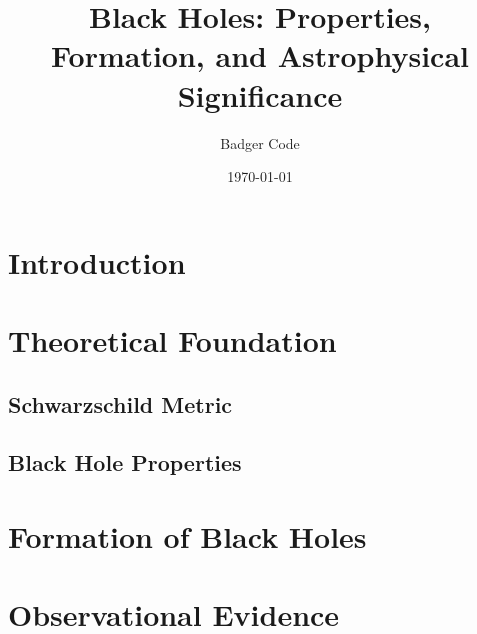 \documentclass{article}
\title{Black Holes: Properties, Formation, and Astrophysical Significance}
\author{Badger Code}
\date{\today}
\begin{document}
\maketitle

\section{Introduction}
\label{sec:introduction}

\section{Theoretical Foundation}
\label{sec:theoretical_foundation}

\subsection{Schwarzschild Metric}
\label{subsec:schwarzschild_metric}


\subsection{Black Hole Properties}
\label{subsec:black_hole_properties}


\section{Formation of Black Holes}
\label{sec:formation}


\section{Observational Evidence}
\label{sec:observational_evidence}
\end{document}
